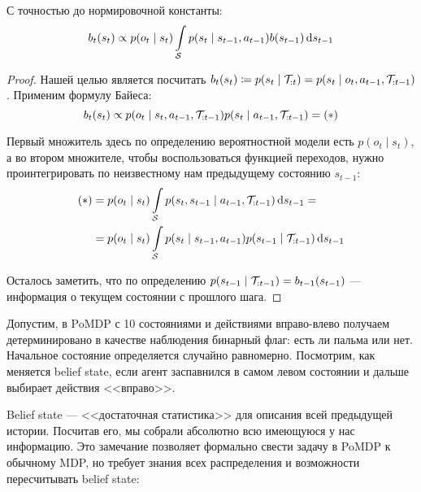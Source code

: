 \begin{theorem}
С точностью до нормировочной константы:
\begin{equation}\label{beliefupdate}
b_t(s_t) \propto p(o_{t} \mid s_{t})\int\limits_{\mathcal{S}} p(s_t \mid s_{t - 1}, a_{t - 1})b(s_{t - 1}) \mathop{}\!\mathrm{d} s_{t - 1}
\end{equation}
\begin{proof}
Нашей целью является посчитать $b_t(s_t) \HM\coloneqq p(s_t \HM\mid \Traj_{:t}) \HM= p(s_t \HM\mid o_t, a_{t-1}, \Traj_{:{t-1}})$. Применим формулу Байеса:
$$b_t(s_t) \propto p(o_t \mid s_t, a_{t-1}, \mathcal{T}_{:{t-1}})p(s_t \mid a_{t-1}, \mathcal{T}_{:{t-1}}) = (*)$$

Первый множитель здесь по определению вероятностной модели есть $p(o_t \mid s_t)$, а во втором множителе, чтобы воспользоваться функцией переходов, нужно проинтегрировать по неизвестному нам предыдущему состоянию $s_{t - 1}$:
\begin{align*}
(*) 
&= p(o_t \mid s_t) \int\limits_{\mathcal{S}} p(s_t, s_{t - 1} \mid a_{t - 1}, \mathcal{T}_{:{t-1}}) \mathop{}\!\mathrm{d} s_{t - 1} = \\ 
&= p(o_t \mid s_t) \int\limits_{\mathcal{S}} p(s_t \mid s_{t - 1}, a_{t - 1})p(s_{t - 1} \mid \mathcal{T}_{:{t-1}}) \mathop{}\!\mathrm{d} s_{t - 1}
\end{align*}

Осталось заметить, что по определению $p(s_{t - 1} \mid \mathcal{T}_{:{t-1}}) = b_{t - 1}(s_{t - 1})$ --- информация о текущем состоянии с прошлого шага.
\end{proof}
\end{theorem}

\begin{exampleBox}[righthand ratio=0.6, sidebyside, sidebyside align=center, lower separated=false]{}
Допустим, в PoMDP с 10 состояниями и действиями вправо-влево получаем детерминировано в качестве наблюдения бинарный флаг: есть ли пальма или нет. Начальное состояние определяется случайно равномерно. Посмотрим, как меняется belief state, если агент заспавнился в самом левом состоянии и дальше выбирает действия <<вправо>>.

\tcblower
{}
\end{exampleBox}

Belief state --- <<достаточная статистика>> для описания всей предыдущей истории. Посчитав его, мы собрали абсолютно всю имеющуюся у нас информацию. Это замечание позволяет формально свести задачу в PoMDP к обычному MDP, но требует знания всех распределения и возможности пересчитывать belief state:

